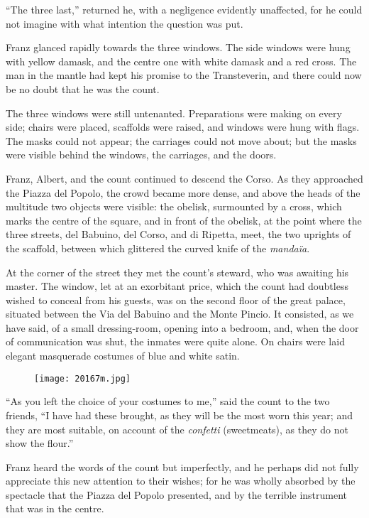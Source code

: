 “The three last,” returned he, with a negligence evidently unaffected,
for he could not imagine with what intention the question was put.

Franz glanced rapidly towards the three windows. The side windows were
hung with yellow damask, and the centre one with white damask and a red
cross. The man in the mantle had kept his promise to the Transteverin,
and there could now be no doubt that he was the count.

The three windows were still untenanted. Preparations were making on
every side; chairs were placed, scaffolds were raised, and windows were
hung with flags. The masks could not appear; the carriages could not
move about; but the masks were visible behind the windows, the
carriages, and the doors.

Franz, Albert, and the count continued to descend the Corso. As they
approached the Piazza del Popolo, the crowd became more dense, and
above the heads of the multitude two objects were visible: the obelisk,
surmounted by a cross, which marks the centre of the square, and in
front of the obelisk, at the point where the three streets, del
Babuino, del Corso, and di Ripetta, meet, the two uprights of the
scaffold, between which glittered the curved knife of the \textit{mandaïa}.

At the corner of the street they met the count’s steward, who was
awaiting his master. The window, let at an exorbitant price, which the
count had doubtless wished to conceal from his guests, was on the
second floor of the great palace, situated between the Via del Babuino
and the Monte Pincio. It consisted, as we have said, of a small
dressing-room, opening into a bedroom, and, when the door of
communication was shut, the inmates were quite alone. On chairs were
laid elegant masquerade costumes of blue and white satin.

\begin{figure}[ht]
\texttt{[image: 20167m.jpg]}
\end{figure}

“As you left the choice of your costumes to me,” said the count to the
two friends, “I have had these brought, as they will be the most worn
this year; and they are most suitable, on account of the \textit{confetti}
(sweetmeats), as they do not show the flour.”

Franz heard the words of the count but imperfectly, and he perhaps did
not fully appreciate this new attention to their wishes; for he was
wholly absorbed by the spectacle that the Piazza del Popolo presented,
and by the terrible instrument that was in the centre.

